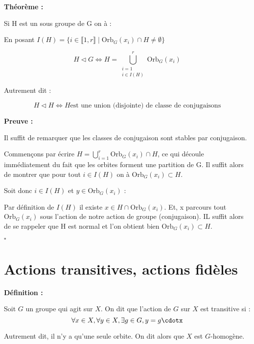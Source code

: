 \documentclass{report}
\renewenvironment{leftbar}{%
  \def\FrameCommand{\vrule width 0.4pt \hspace{10pt}}%
  \MakeFramed {\advance\hsize-\width \FrameRestore}}%
 {\endMakeFramed}%
\newenvironment{definition}[1][]{
    \begin{tcolorbox}[colframe= white]
    \textbf{Définition :} 
    #1 \par
    }
    {\end{tcolorbox}}
\newenvironment{preuve}{\vspace*{0.5cm}
    \begin{leftbar}
    \noindent\textbf{Preuve :}\par}{
    \begin{flushright}
    $\square$
    \end{flushright}
    \end{leftbar}
}
\newenvironment{theoreme}[1][]{
    \begin{tcolorbox}[]
    \textbf{Théorème :} #1  \par} 
    {\end{tcolorbox}}
\newcommand{\dsp}{\displaystyle}
\newcommand{\orb}{\text{Orb}}
\begin{document}
\begin{theoreme}
Si H est un sous groupe de G on à :\par
En posant \( I(H) = \{ i\in \llbracket  1,r\rrbracket  \mid \orb_{G}(x_{i}) \cap H \neq \emptyset \} \)
\begin{center}
\[
H \triangleleft G \Longleftrightarrow H = \bigcup_{\substack{i=1 \\ i \in I(H)}}^{r} \orb_{G}(x_{i})
\]
\end{center}
Autrement dit :
\begin{center}
\[ H\triangleleft H \Longleftrightarrow H\text{est une union (disjointe) de classe de conjugaisons} \]
\end{center}
\end{theoreme}

\begin{preuve}
\fbox{$\Leftarrow$}\par 
Il suffit de remarquer que les classes de conjugaison sont stables par conjugaison.\par 

\fbox{$\Rightarrow$}\par
Commençons par écrire  $\dsp H = \bigcup_{i=1}^{r}\orb_{G}(x_{i})\cap H$, ce qui découle immédiatement du fait que les orbites forment une partition de G. Il suffit alors de montrer que pour tout $i\in I(H)$ on à $\orb_{G}(x_{i})\subset H$.\par 
Soit donc $i\in I(H)$ et $y\in \orb_{G}(x_{i})$ :\par 
Par définition de $I(H)$ il existe $x\in H \cap \orb_{G}(x_{i})$. Et, x parcours tout $\orb_{G}(x_{i})$ sous l'action de notre action de groupe (conjugaison). IL suffit alors de se rappeler que H est normal et l'on obtient bien $\orb_{G}(x_{i})\subset H$.
\end{preuve}

\section{Actions transitives, actions fidèles}

\begin{definition} 
Soit $G$ un groupe qui agit sur $X$. On dit que l'action de $G$ sur $X$ est transitive si :
$$\forall x \in X, \forall y \in X, \exists g \in G, y = g\cdotx$$
\end {definition} 

Autrement dit, il n'y a qu'une seule orbite. On dit alors que $X$ est $G$-homogène.
\end{document}
